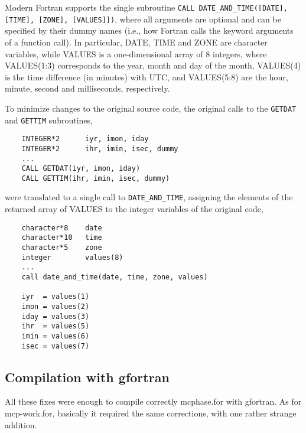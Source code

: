 Modern Fortran supports the single subroutine \lstinline[columns=fixed]{CALL DATE_AND_TIME([DATE], [TIME], [ZONE], [VALUES]])}, where all arguments are optional and can be specified by their dummy names (i.e., how Fortran calls the keyword arguments of a function call). 
In particular, \textsf{DATE}, \textsf{TIME} and \textsf{ZONE} are character variables, while \textsf{VALUES} is a one-dimensional array of 8 integers, where \textsf{VALUES(1:3)} corresponds to the year, month and day of the month, \textsf{VALUES(4)} is the time difference (in minutes) with UTC, and \textsf{VALUES(5:8)} are the hour, minute, second and milliseconds, respectively.

To minimize changes to the original source code, the original calls to the \lstinline[columns=fixed]{GETDAT} and \lstinline[columns=fixed]{GETTIM} subroutines,

\begin{lstlisting}
	INTEGER*2      iyr, imon, iday
	INTEGER*2      ihr, imin, isec, dummy
	...
	CALL GETDAT(iyr, imon, iday)
	CALL GETTIM(ihr, imin, isec, dummy)
\end{lstlisting}

were translated to a single call to \lstinline[columns=fixed]{DATE_AND_TIME}, assigning the elements of the returned array of \textsf{VALUES} to the integer variables of the original code,

\begin{lstlisting}
	character*8    date
	character*10   time
	character*5    zone
	integer        values(8)
	...
	call date_and_time(date, time, zone, values)

	iyr  = values(1)
	imon = values(2)
	iday = values(3)
	ihr  = values(5)
	imin = values(6)
	isec = values(7)
\end{lstlisting}



\subsection{Compilation with gfortran}
\label{compilation-with-gfortran}

All these fixes were enough to compile correctly \textsf{mcphase.for} with gfortran.
As for \textsf{mcp-work.for}, basically it required the same corrections, with one rather strange addition.

